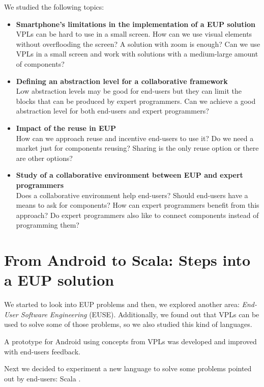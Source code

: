 \documentclass[9pt,a4paper]{extarticle}
\begin{document}
\begin{multicols}{2}
We studied the following topics: 

\begin{itemize}
	\item{\textbf{Smartphone's limitations in the implementation of a EUP solution} \\
    VPLs can be hard to use in a small screen. How can we use visual elements without overflooding the screen? A solution with zoom is enough?
	Can we use VPLs in a small screen and work with solutions with a medium-large amount of components?}
	
	\item{\textbf{Defining an abstraction level for a collaborative framework} \\
	Low abstraction levels may be good for end-users but they can limit the blocks that can be produced by expert programmers.
	Can we achieve a good abstraction level for both end-users and expert programmers?}
  
	\item{\textbf{Impact of the reuse in EUP} \\
    How can we approach reuse and incentive end-users to use it?
    Do we need a market just for components reusing? 
	Sharing is the only reuse option or there are other options?}
	
	\item{\textbf{Study of a collaborative environment between EUP and expert programmers} \\
    Does a collaborative environment help end-users? Should end-users have a means to ask for components? 
    How can expert programmers benefit from this approach? 
    Do expert programmers also like to connect components instead of programming them?}
\end{itemize}


\section{From Android to Scala: Steps into a EUP solution}\label{sec:work}

We started to look into EUP problems \cite{Barriers2004} and then, we explored another area: \emph{End-User Software Engineering} (EUSE).
Additionally, we found out that VPLs can be used to solve some of those problems, so we also studied this kind of languages.

A prototype for Android using concepts from VPLs was developed and improved with end-users feedback. 

Next we decided to experiment a new language to solve some problems pointed out by end-users: Scala \cite{ProgrammingScala}.


\end{multicols}
\end{document}
